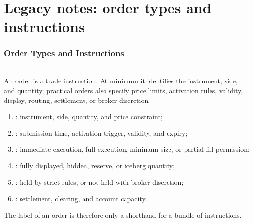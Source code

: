 \documentclass[a4paper,oneside,openany]{book}
\begin{document}
\chapter*{Legacy notes: order types and instructions}

\subsection*{Order Types and Instructions}

\begin{definition} \\
An order is a trade instruction. At minimum it identifies the instrument, side, and quantity; practical orders also specify price limits, activation rules, validity, display, routing, settlement, or broker discretion.
\end{definition}

\begin{taxonomy} 
\begin{enumerate}[label=\roman*.]
\setlength{\itemsep}{0pt}
\item {}: instrument, side, quantity, and price constraint;
\item {}: submission time, activation trigger, validity, and expiry;
\item {}: immediate execution, full execution, minimum size, or partial-fill permission;
\item {}: fully displayed, hidden, reserve, or iceberg quantity;
\item {}: held by strict rules, or not-held with broker discretion;
\item {}: settlement, clearing, and account capacity.
\end{enumerate}
The label of an order is therefore only a shorthand for a bundle of instructions.
\end{taxonomy}
\end{document}
